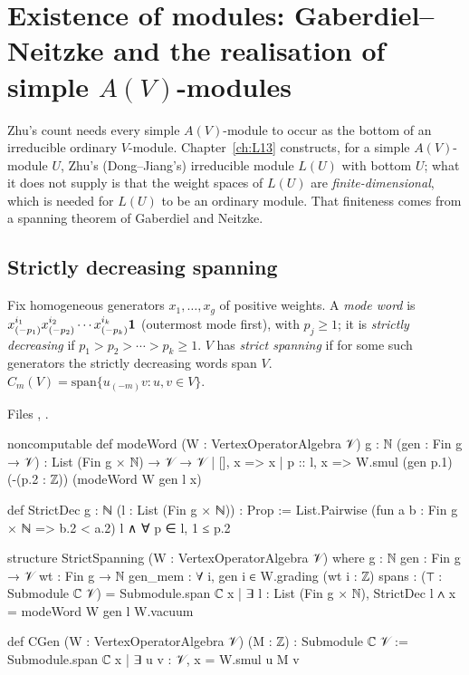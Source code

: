 \section[Existence of modules: Gaberdiel--Neitzke]{Existence of modules: Gaberdiel--Neitzke and the realisation of simple \texorpdfstring{$A(V)$}{A(V)}-modules}\label{l15:sec:gn}

Zhu's count needs every simple $A(V)$-module to occur as the bottom of an irreducible ordinary $V$-module. Chapter~\ref{ch:L13}
constructs, for a simple $A(V)$-module $U$, Zhu's (Dong--Jiang's) irreducible module $L(U)$ with bottom $U$; what it does not
supply is that the weight spaces of $L(U)$ are \emph{finite-dimensional}, which is needed for $L(U)$ to be an ordinary module.
That finiteness comes from a spanning theorem of Gaberdiel and Neitzke.

\subsection{Strictly decreasing spanning}

\begin{definition}\label{l15:def:strict}
Fix homogeneous generators $x_1,\dots,x_g$ of positive weights. A \emph{mode word} is
$x^{i_1}_{(-p_1)}x^{i_2}_{(-p_2)}\cdots x^{i_k}_{(-p_k)}\mathbf{1}$ (outermost mode first), with $p_j\ge1$; it is
\emph{strictly decreasing} if $p_1>p_2>\cdots>p_k\ge1$. $V$ has \emph{strict spanning} if for some such generators the
strictly decreasing words span $V$. $C_m(V)=\mathrm{span}\{u_{(-m)}v:u,v\in V\}$.
\end{definition}
\noindent Files , .
\begin{leancode}
noncomputable def modeWord (W : VertexOperatorAlgebra 𝒱) {g : ℕ} (gen : Fin g → 𝒱) :
    List (Fin g × ℕ) → 𝒱 → 𝒱
  | [], x => x
  | p :: l, x => W.smul (gen p.1) (-(p.2 : ℤ)) (modeWord W gen l x)

def StrictDec {g : ℕ} (l : List (Fin g × ℕ)) : Prop :=
  List.Pairwise (fun a b : Fin g × ℕ => b.2 < a.2) l ∧ ∀ p ∈ l, 1 ≤ p.2

structure StrictSpanning (W : VertexOperatorAlgebra 𝒱) where
  g : ℕ
  gen : Fin g → 𝒱
  wt : Fin g → ℕ
  gen_mem : ∀ i, gen i ∈ W.grading (wt i : ℤ)
  spans : (⊤ : Submodule ℂ 𝒱) = Submodule.span ℂ
    {x | ∃ l : List (Fin g × ℕ), StrictDec l ∧ x = modeWord W gen l W.vacuum}

def CGen (W : VertexOperatorAlgebra 𝒱) (M : ℤ) : Submodule ℂ 𝒱 :=
  Submodule.span ℂ {x | ∃ u v : 𝒱, x = W.smul u M v}
\end{leancode}

